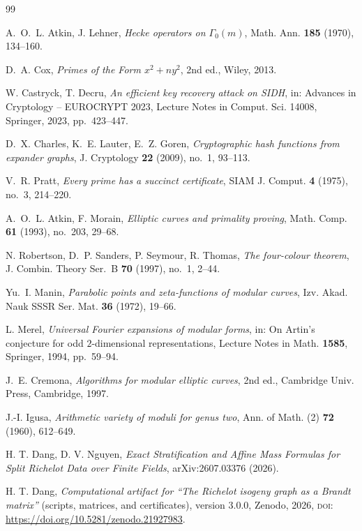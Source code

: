 \documentclass[11pt]{amsart}
\providecommand{\doi}[1]{\textsc{doi:}\,\url{https://doi.org/#1}}
\theoremstyle{plain}
\theoremstyle{definition}
\begin{document}
	\begin{thebibliography}{99}
		
		 A.~O.~L. Atkin, J. Lehner, \emph{Hecke operators on
			$\Gamma_0(m)$}, Math. Ann. \textbf{185} (1970), 134--160.
		
		 D.~A. Cox, \emph{Primes of the Form $x^2+ny^2$}, 2nd ed.,
		Wiley, 2013.
		
		 W. Castryck, T. Decru, \emph{An efficient key recovery
			attack on SIDH}, in: Advances in Cryptology -- EUROCRYPT 2023, Lecture Notes in
		Comput. Sci. 14008, Springer, 2023, pp.~423--447.
		
		 D.~X. Charles, K.~E. Lauter, E.~Z. Goren, \emph{Cryptographic
			hash functions from expander graphs}, J. Cryptology \textbf{22} (2009), no.~1,
		93--113.
		
		 V.~R. Pratt, \emph{Every prime has a succinct
			certificate}, SIAM J. Comput. \textbf{4} (1975), no.~3, 214--220.
		
		 A.~O.~L. Atkin, F. Morain, \emph{Elliptic
			curves and primality proving}, Math. Comp. \textbf{61} (1993),
		no.~203, 29--68.
		
		 N. Robertson, D.~P. Sanders, P. Seymour, R. Thomas,
		\emph{The four-colour theorem}, J. Combin. Theory Ser.~B \textbf{70}
		(1997), no.~1, 2--44.
		
		 Yu.~I. Manin, \emph{Parabolic points and
			zeta-functions of modular curves}, Izv. Akad. Nauk SSSR Ser. Mat.
		\textbf{36} (1972), 19--66.
		
		 L. Merel, \emph{Universal Fourier expansions of
			modular forms}, in: On Artin's conjecture for odd $2$-dimensional
		representations, Lecture Notes in Math. \textbf{1585}, Springer, 1994,
		pp.~59--94.
		
		 J.~E. Cremona, \emph{Algorithms for modular
			elliptic curves}, 2nd ed., Cambridge Univ. Press, Cambridge, 1997.
		
		 J.-I. Igusa, \emph{Arithmetic variety of moduli for genus
			two}, Ann. of Math. (2) \textbf{72} (1960), 612--649.
		
		 H. T. Dang, D. V. Nguyen, \emph{Exact Stratification and Affine Mass Formulas for Split Richelot Data over Finite Fields},
		arXiv:2607.03376 (2026).
		
		 H. T. Dang, \emph{Computational artifact for ``The Richelot
			isogeny graph as a Brandt matrix''} (scripts, matrices, and certificates), version 3.0.0, Zenodo, 2026, \doi{10.5281/zenodo.21927983}.
		

\end{thebibliography}
\end{document}
